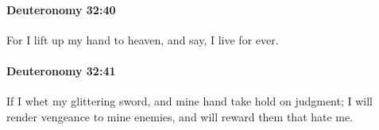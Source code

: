 		\paragraph{Deuteronomy 32:40} %
			\label{DEUTERONOMY-32-40}

			For I lift up my hand to heaven, and say, I live for ever.


		\paragraph{Deuteronomy 32:41} %
			\label{DEUTERONOMY-32-41}

			If I whet my glittering sword, and mine hand take hold on judgment; I will render vengeance to mine enemies, and will reward them that hate me.


